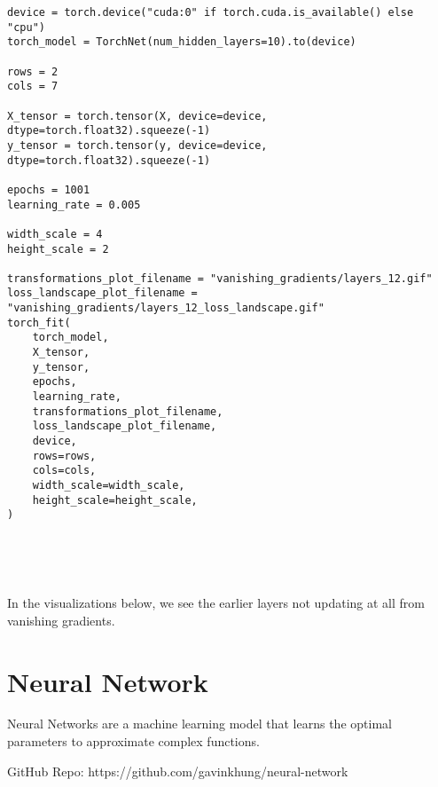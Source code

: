 \documentclass[openany]{book}
\begin{document}
\begin{tcolorbox}
\tiny
\begin{verbatim}
device = torch.device("cuda:0" if torch.cuda.is_available() else "cpu")
torch_model = TorchNet(num_hidden_layers=10).to(device)

rows = 2
cols = 7

X_tensor = torch.tensor(X, device=device, dtype=torch.float32).squeeze(-1)
y_tensor = torch.tensor(y, device=device, dtype=torch.float32).squeeze(-1)

epochs = 1001
learning_rate = 0.005

width_scale = 4
height_scale = 2

transformations_plot_filename = "vanishing_gradients/layers_12.gif"
loss_landscape_plot_filename = "vanishing_gradients/layers_12_loss_landscape.gif"
torch_fit(
    torch_model,
    X_tensor,
    y_tensor,
    epochs,
    learning_rate,
    transformations_plot_filename,
    loss_landscape_plot_filename,
    device,
    rows=rows,
    cols=cols,
    width_scale=width_scale,
    height_scale=height_scale,
)
\end{verbatim}
\end{tcolorbox}

    \begin{center}
    \end{center}
    { \hspace*{\fill} \\}
    
    \begin{center}
    \end{center}
    { \hspace*{\fill} \\}
    
    In the visualizations below, we see the earlier layers not updating at
all from vanishing gradients.
        
    \section{Neural Network}\label{neural-network}

Neural Networks are a machine learning model that learns the optimal
parameters to approximate complex functions.

GitHub Repo: https://github.com/gavinkhung/neural-network
\end{document}
